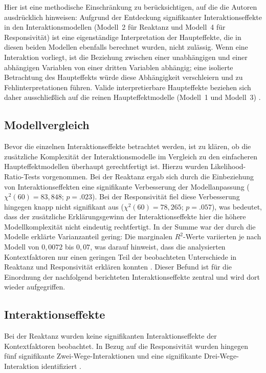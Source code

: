 \documentclass[11pt,a4paper]{article}
\begin{document}
Hier ist eine methodische Einschränkung zu berücksichtigen, auf die die Autoren ausdrücklich
hinweisen: Aufgrund der Entdeckung signifikanter Interaktionseffekte in den
Interaktionsmodellen (Modell~2 für Reaktanz und Modell~4 für Responsivität) ist eine
eigenständige Interpretation der Haupteffekte, die in diesen beiden Modellen ebenfalls
berechnet wurden, nicht zulässig. Wenn eine Interaktion vorliegt, ist die Beziehung zwischen
einer unabhängigen und einer abhängigen Variablen von einer dritten Variablen abhängig; eine
isolierte Betrachtung des Haupteffekts würde diese Abhängigkeit verschleiern und zu
Fehlinterpretationen führen. Valide interpretierbare Haupteffekte beziehen sich daher
ausschließlich auf die reinen Haupteffektmodelle (Modell~1 und Modell~3)
\citep{meinhardt2025scrolling}.

\subsection{Modellvergleich}
\label{sec:modellvergleich}

Bevor die einzelnen Interaktionseffekte betrachtet werden, ist zu klären, ob die zusätzliche
Komplexität der Interaktionsmodelle im Vergleich zu den einfacheren Haupteffektmodellen
überhaupt gerechtfertigt ist. Hierzu wurden Likelihood-Ratio-Tests
vorgenommen. Bei der Reaktanz ergab sich durch die Einbeziehung von Interaktionseffekten eine
signifikante Verbesserung der Modellanpassung ($\chi^2(60)=83{,}848$; $p=.023$). Bei der
Responsivität fiel diese Verbesserung hingegen knapp nicht signifikant aus
($\chi^2(60)=78{,}265$; $p=.057$), was bedeutet, dass der zusätzliche Erklärungsgewinn der
Interaktionseffekte hier die höhere Modellkomplexität nicht eindeutig rechtfertigt. In der
Summe war der durch die Modelle erklärte Varianzanteil gering: Die marginalen $R^2$-Werte
variierten je nach Modell von $0{,}0072$ bis $0{,}07$, was darauf hinweist, dass die
analysierten Kontextfaktoren nur einen geringen Teil der beobachteten Unterschiede in
Reaktanz und Responsivität erklären konnten \citep{meinhardt2025scrolling}. Dieser Befund ist
für die Einordnung der nachfolgend berichteten Interaktionseffekte zentral und wird dort
wieder aufgegriffen.

\subsection{Interaktionseffekte}

Bei der Reaktanz wurden keine signifikanten Interaktionseffekte der Kontextfaktoren
beobachtet. In Bezug auf die Responsivität wurden hingegen fünf signifikante
Zwei-Wege-Interaktionen und eine signifikante Drei-Wege-Interaktion identifiziert
\citep{meinhardt2025scrolling}.
\end{document}

